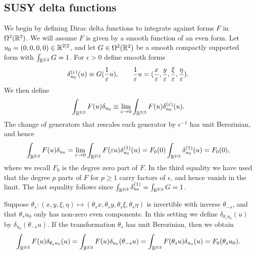 \documentclass[11pt,a4paper]{article}
\begin{document}
\subsection{SUSY delta functions}
\label{app:delta}

We begin by defining Dirac delta functions to integrate against forms
$F$ in $\Omega^{2}(\mathbb{R}^{2})$. We will assume $F$ is given by a smooth
function of an even form.  Let $u_{0}=(0,0,0,0)\in \mathbb{R}^{2|2}$, and let
$G\in \Omega^{2}(\mathbb{R}^{2})$ be a smooth compactly supported form with
$\int_{\mathbb{R}^{2|2}}G = 1$. For $\epsilon>0$ define smooth forms
\begin{equation}
  \label{eq:delta}
  \delta^{(\varepsilon)}_{u_{0}}(u) \equiv G(\frac{1}{\varepsilon}u), \qquad
  \frac{1}{\varepsilon}u = (\frac{x}{\varepsilon}, \frac{y}{\varepsilon},
  \frac{\xi}{\varepsilon}, \frac{\eta}{\varepsilon}). 
\end{equation}
We then define
\begin{equation}
  \label{eq:delta-1}
  \int_{\mathbb{R}^{2|2}} F(u) \delta_{u_{0}} \equiv \lim_{\varepsilon\to 0}
  \int_{\mathbb{R}^{2|2}} F(u) \delta^{(\varepsilon)}_{u_{0}}(u).
\end{equation}
The change of generators that rescales each generator
by $\epsilon^{-1}$ has unit Berezinian, and hence
\begin{equation}
  \label{eq:delta-2}
  \int_{\mathbb{R}^{2|2}} F(u)\delta_{u_{0}} = \lim_{\varepsilon\to
    0}\int_{\mathbb{R}^{2|2}} F(\varepsilon u) \delta^{(1)}_{u_{0}}(u) =
  F_{0}(0)\int_{\mathbb{R}^{2|2}} \delta^{(1)}_{u_{0}}(u) = F_{0}(0), 
\end{equation}
where we recall $F_{0}$ is the degree zero part of $F$.
In the third equality we have used that the degree $p$ parts of $F$
for $p\geq 1$ carry factors of $\epsilon$, and hence vanish in the
limit. The last equality follows
since $\int_{\mathbb{R}^{2|2}} \delta^{(1)}_{u_{0}} = \int_{\mathbb{R}^{2|2}} G = 1$.

Suppose
$\theta_{s}\colon (x,y,\xi,\eta)\mapsto
(\theta_{s}x,\theta_{s}y,\theta_{s}\xi,\theta_{s}\eta)$ is invertible
with inverse $\theta_{-s}$, and that $\theta_{s}u_{0}$ only has
non-zero even components. In this setting we define
$\delta_{\theta_{s}u_{0}}(u)$ by $\delta_{u_{0}}(\theta_{-s}u)$. If
the transformation $\theta_{s}$ has unit Berezinian, then we obtain
\begin{equation}
  \label{eq:delta-3}
  \int_{\mathbb{R}^{2|2}} F(u) \delta_{\theta_s u_0}(u) = \int_{\mathbb{R}^{2|2}}
  F(u) \delta_{u_0}(\theta_{-s}u) = \int_{\mathbb{R}^{2|2}} F(\theta_s u) \delta_{u_0}(u)
  = F_{0}(\theta_s u_0).
\end{equation}
\end{document}
